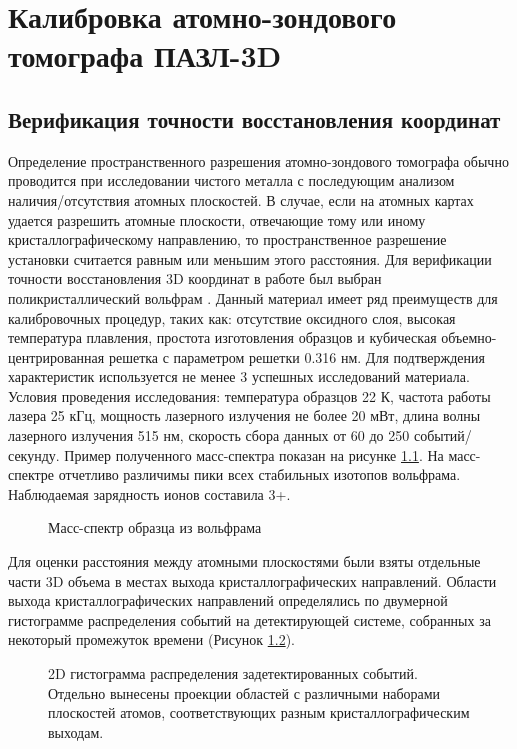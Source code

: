 \chapter{Калибровка атомно-зондового томографа ПАЗЛ-3D}\label{ch:ch3}

\section{Верификация точности восстановления координат}\label{sec:ch3/sect1}

Определение пространственного разрешения атомно-зондового томографа обычно проводится при исследовании чистого металла с последующим анализом наличия/отсутствия атомных плоскостей. В случае, если на атомных картах удается разрешить атомные плоскости, отвечающие тому или иному кристаллографическому направлению, то пространственное разрешение установки считается равным или меньшим этого расстояния. Для верификации точности восстановления 3D координат в работе был выбран поликристаллический вольфрам  \cite{scbibAPPLE}. Данный материал имеет ряд преимуществ для калибровочных процедур, таких как: отсутствие оксидного слоя, высокая температура плавления, простота изготовления образцов и кубическая объемно-центрированная решетка с параметром решетки 0.316 нм. Для подтверждения характеристик используется не менее 3 успешных исследований материала. Условия проведения исследования: температура образцов 22 К, частота работы лазера 25 кГц, мощность лазерного излучения не более 20 мВт, длина волны лазерного излучения 515 нм, скорость сбора данных от 60 до 250 событий/секунду. Пример полученного масс-спектра показан на рисунке \cref{fig:W_massspectr}. На масс-спектре отчетливо различимы пики всех стабильных изотопов вольфрама. Наблюдаемая зарядность ионов составила 3+. 

\begin{figure}[htb]
	\caption{Масс-спектр образца из вольфрама}
	\label{fig:W_massspectr}
\end{figure}

Для оценки расстояния между атомными плоскостями были взяты отдельные части 3D объема в местах выхода кристаллографических направлений. Области выхода кристаллографических направлений определялись по двумерной гистограмме распределения событий на детектирующей системе, собранных за некоторый промежуток времени (Рисунок \cref{fig:W_3D}).

\begin{figure}[htb]
	\centerfloat{
		\texttt{[image: W\_3D]}
	}
	\caption{2D гистограмма распределения задетектированных событий. Отдельно вынесены проекции областей с различными наборами плоскостей атомов, соответствующих разным кристаллографическим выходам.}
	\label{fig:W_3D}
\end{figure}

